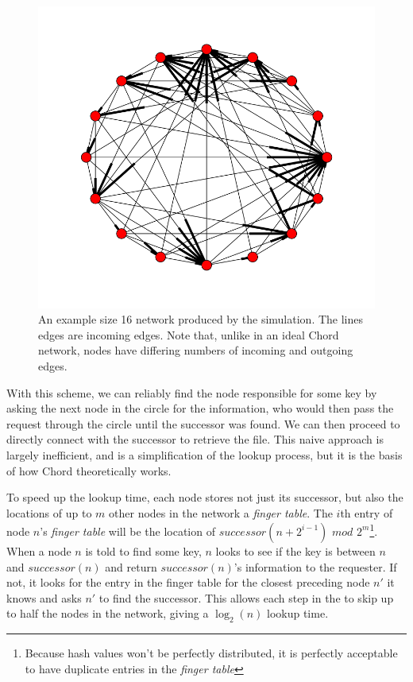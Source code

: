 \documentclass[12pt]{article} %
\begin{document}
\begin{figure}
\includegraphics[width=\linewidth]{chordreal}
\caption{An example size 16 network produced by the simulation.  The lines edges are incoming edges.  Note that, unlike in an ideal Chord network, nodes have differing numbers of incoming and outgoing edges.}
\label{chordreal}
\end{figure}


With this scheme, we can reliably find the node responsible for some key by asking the next node in the circle for the information, who would then pass the request through the circle until the successor was found.  We can then proceed to directly connect with the successor to retrieve the file.  This naive approach is largely inefficient, and is a simplification of the lookup process, but it is the basis of how Chord theoretically works.

To speed up the lookup time, each node stores not just its successor, but also the locations of up to $m$ other nodes in the network a \emph{finger table}.  The $i$th entry of node $n$'s \emph{finger table} will be the location of $successor(n+2^{i-1})$ $mod$ $2^m$\footnote{Because hash values won't be perfectly distributed, it is perfectly acceptable to have duplicate entries in the \emph{finger table}}. When a node $n$ is told to find some key, $n$ looks to see if the key is between $n$ and $successor(n)$ and return $successor(n)$'s information to the requester. If not, it looks for the entry in the finger table for the closest preceding node $n'$ it knows and asks $n'$ to find the successor.  This allows each step in the to skip up to half the nodes in the network, giving a $\log_2(n)$ lookup time.   %
\end{document}
